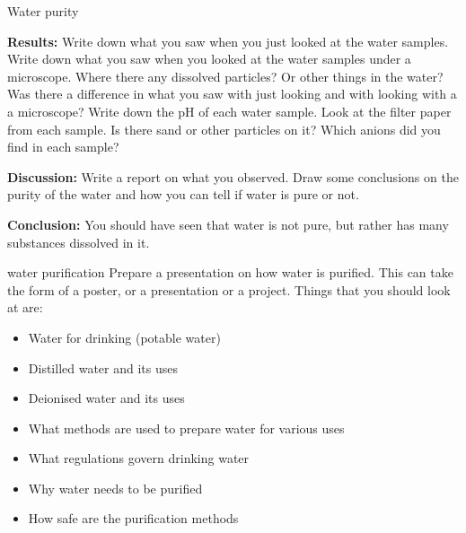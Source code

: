 \begin{g_experiment}{Water purity}
\par  
\label{m38138*id63284}\noindent{}\textbf{Results:}\newline
Write down what you saw when you just looked at the water samples. Write down what you saw when you looked at the water samples under a microscope. Where there any dissolved particles? Or other things in the water? Was there a difference in what you saw with just looking and with looking with a a microscope? Write down the pH of each water sample. Look at the filter paper from each sample. Is there sand or other particles on it? Which anions did you find in each sample? 
\par 
\label{m38138*id3429827}\noindent{}\textbf{Discussion:}\newline
Write a report on what you observed. Draw some conclusions on the purity of the water and how you can tell if water is pure or not.
\par  
\label{m38138*id68921}\noindent{}\textbf{Conclusion:}\newline
    You should have seen that water is not pure, but rather has many substances dissolved in it.
\par 
\end{g_experiment}
\label{m38138*id672214}
            \begin{project}{water purification}
            \nopagebreak
\label{m38138*id97324}
Prepare a presentation on how water is purified. This can take the form of a poster, or a presentation or a project. Things that you should look at are:
\label{m38138*id097324}\begin{itemize}[noitemsep]
            \item Water for drinking (potable water)\item Distilled water and its uses\item Deionised water and its uses\item What methods are used to prepare water for various uses\item What regulations govern drinking water\item Why water needs to be purified\item How safe are the purification methods\end{itemize}
\par 
\end{project}
